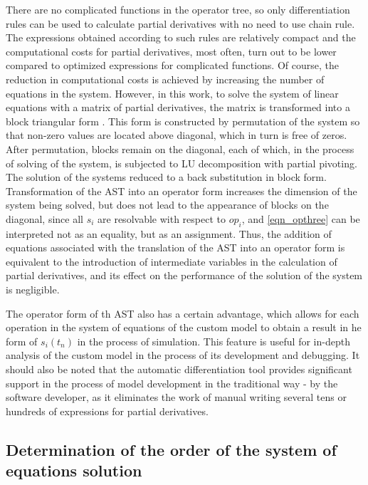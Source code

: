 \documentclass[lettersize,journal]{IEEEtran}
\begin{document}
There are no complicated functions in the operator tree, so only differentiation rules can be used to calculate partial derivatives with no need
to use chain rule.  The expressions obtained according to such rules are relatively compact and the computational costs for partial
derivatives, most often, turn out to be lower compared to optimized expressions for complicated functions. Of course, the reduction in 
computational costs is achieved by increasing the number of equations in the system. However, in this work, to solve the system of linear equations
with a matrix of partial derivatives, the matrix is transformed into a block triangular form \cite{davis12}. This form is constructed by  
permutation of the system so that non-zero values are located above diagonal, which in turn is free of zeros. 
After permutation, blocks remain on the diagonal, each of which, in the process of solving of the system, is subjected to LU decomposition 
with partial pivoting. The solution of the systems reduced to a back substitution in block form. Transformation of the AST into an operator form 
increases the dimension of the system being solved, but does not lead to the appearance of blocks on the diagonal, since all \(s_i\) are 
resolvable with respect to \(op_i\), and \eqref{eqn_opthree} can be interpreted not as an equality, but as an assignment. Thus, the addition 
of equations associated with the translation of the AST into an operator form is equivalent to the introduction of intermediate variables in the
calculation of partial derivatives, and its effect on the performance of the solution of the system is negligible.

The operator form of th AST also has a certain advantage, which allows for each operation in the system of equations of the custom model to 
obtain a result in he form of \(s_i (t_n)\) in the process of simulation. This feature is useful for in-depth analysis of the custom model 
in the process of its development and debugging. It should also be noted that the automatic differentiation tool provides significant support 
in the process of model development in the traditional way - by the software developer, as it eliminates the work of manual writing 
several tens or hundreds of expressions for partial derivatives.

\subsection{Determination of the order of the system of equations solution} 
\end{document}
